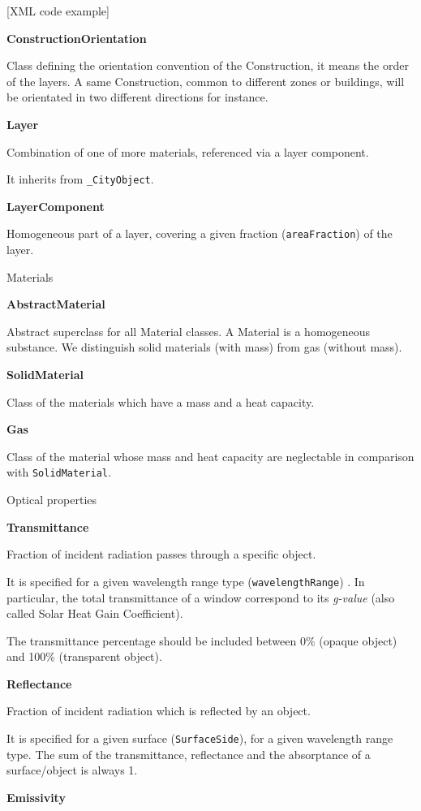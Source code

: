 \documentclass[a4paper,12pt]{article}
\begin{document}
{[}XML code example{]}

\textbf{ConstructionOrientation}

Class defining the orientation convention of the Construction, it means
the order of the layers. A same Construction, common to different zones
or buildings, will be orientated in two different directions for
instance.

\textbf{Layer}

Combination of one of more materials, referenced via a layer component.

It inherits from \texttt{\_CityObject}.

\textbf{LayerComponent}

Homogeneous part of a layer, covering a given fraction
(\texttt{areaFraction}) of the layer.

Materials

\textbf{AbstractMaterial}

Abstract superclass for all Material classes. A Material is a
homogeneous substance. We distinguish solid materials (with mass) from
gas (without mass).

\textbf{SolidMaterial}

Class of the materials which have a mass and a heat capacity.

\textbf{Gas}

Class of the material whose mass and heat capacity are neglectable in
comparison with \texttt{SolidMaterial}.

Optical properties

\textbf{Transmittance}

Fraction of incident radiation passes through a specific object.

It is specified for a given wavelength range type
(\texttt{wavelengthRange}) . In particular, the total transmittance of a
window correspond to its \emph{g-value} (also called Solar Heat Gain
Coefficient).

The transmittance percentage should be included between 0\% (opaque
object) and 100\% (transparent object).

\textbf{Reflectance}

Fraction of incident radiation which is reflected by an object.

It is specified for a given surface (\texttt{SurfaceSide}), for a given
wavelength range type. The sum of the transmittance, reflectance and the
absorptance of a surface/object is always 1.

\textbf{Emissivity}
\end{document}
